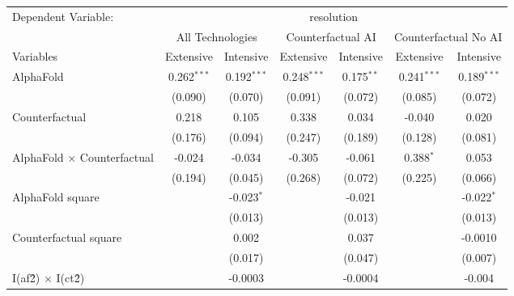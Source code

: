 \begingroup
\centering
\begin{tabular}{lcccccc}
   \tabularnewline \midrule \midrule
   Dependent Variable: & \multicolumn{6}{c}{resolution}\\
 & \multicolumn{2}{c}{All Technologies} & \multicolumn{2}{c}{Counterfactual AI} & \multicolumn{2}{c}{Counterfactual No AI} \\
\cmidrule(lr){1-1}\cmidrule(lr){2-3} \cmidrule(lr){4-5} \cmidrule(lr){6-7}
Variables & \multicolumn{1}{c}{Extensive} & \multicolumn{1}{c}{Intensive} & \multicolumn{1}{c}{Extensive} & \multicolumn{1}{c}{Intensive} & \multicolumn{1}{c}{Extensive} & \multicolumn{1}{c}{Intensive} \\
\cmidrule(lr){1-1}\cmidrule(lr){2-2} \cmidrule(lr){3-3} \cmidrule(lr){4-4} \cmidrule(lr){5-5} \cmidrule(lr){6-6} \cmidrule(lr){7-7}
   AlphaFold                          & 0.262$^{***}$ & 0.192$^{***}$ & 0.248$^{***}$ & 0.175$^{**}$ & 0.241$^{***}$ & 0.189$^{***}$\\   
                                      & (0.090)       & (0.070)       & (0.091)       & (0.072)      & (0.085)       & (0.072)\\   
   Counterfactual                     & 0.218         & 0.105         & 0.338         & 0.034        & -0.040        & 0.020\\   
                                      & (0.176)       & (0.094)       & (0.247)       & (0.189)      & (0.128)       & (0.081)\\   
   AlphaFold $\times$ Counterfactual  & -0.024        & -0.034        & -0.305        & -0.061       & 0.388$^{*}$   & 0.053\\   
                                      & (0.194)       & (0.045)       & (0.268)       & (0.072)      & (0.225)       & (0.066)\\   
   AlphaFold square                   &               & -0.023$^{*}$  &               & -0.021       &               & -0.022$^{*}$\\   
                                      &               & (0.013)       &               & (0.013)      &               & (0.013)\\   
   Counterfactual square              &               & 0.002         &               & 0.037        &               & -0.0010\\   
                                      &               & (0.017)       &               & (0.047)      &               & (0.007)\\   
   I(af\^2) $\times$ I(ct\^2)         &               & -0.0003       &               & -0.0004      &               & -0.004\\   

\end{tabular}
